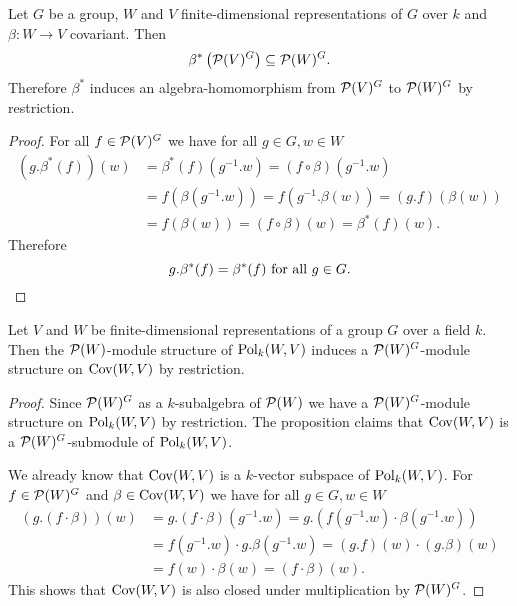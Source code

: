 \begin{prop}
 Let $G$ be a group, $W$ and $V$ finite-dimensional representations of $G$ over $k$ and $\beta \colon W \to V$ covariant. Then
 \[
  \beta^*\left(\mathcal{P}(V)^G\right) \subseteq \mathcal{P}(W)^G.
 \]
 Therefore $\beta^*$ induces an algebra-homomorphism from $\mathcal{P}(V)^G$ to $\mathcal{P}(W)^G$ by restriction.
\end{prop}
\begin{proof}
 For all $f \in \mathcal{P}(V)^G$ we have for all $g \in G, w \in W$
 \begin{align*}
  (g.\beta^*(f))(w)
  &= \beta^*(f)\left(g^{-1}.w\right)
  = (f \circ \beta)\left(g^{-1}.w\right) \\
  &= f\left(\beta\left(g^{-1}.w\right)\right)
  = f\left(g^{-1}.\beta(w)\right)
  = (g.f)(\beta(w)) \\
  &= f(\beta(w))
  = (f \circ \beta)(w)
  = \beta^*(f)(w).
 \end{align*}
 Therefore
 \[
  g.\beta^*(f) = \beta^*(f) \text{ for all } g \in G.
  \qedhere
 \]
\end{proof}


\begin{prop}
 Let $V$ and $W$ be finite-dimensional representations of a group $G$ over a field $k$. Then the $\mathcal{P}(W)$-module structure of $\operatorname{Pol}_k(W,V)$ induces a $\mathcal{P}(W)^G$-module structure on $\operatorname{Cov}(W,V)$ by restriction.
\end{prop}
\begin{proof}
 Since $\mathcal{P}(W)^G$ as a $k$-subalgebra of $\mathcal{P}(W)$ we have a $\mathcal{P}(W)^G$-module structure on $\operatorname{Pol}_k(W,V)$ by restriction. The proposition claims that $\operatorname{Cov}(W,V)$ is a $\mathcal{P}(W)^G$-submodule of $\operatorname{Pol}_k(W,V)$.
 
 We already know that $\operatorname{Cov}(W,V)$ is a $k$-vector subspace of $\operatorname{Pol}_k(W,V)$. For $f \in \mathcal{P}(W)^G$ and $\beta \in \operatorname{Cov}(W,V)$ we have for all $g \in G, w \in W$
 \begin{align*}
  (g.(f \cdot \beta))(w)
  &= g.(f \cdot \beta)\left(g^{-1}.w\right)
  = g.\left(f\left(g^{-1}.w\right) \cdot \beta\left(g^{-1}.w\right) \right) \\
  &= f\left(g^{-1}.w\right) \cdot g.\beta\left(g^{-1}.w\right)
  = (g.f)(w) \cdot (g.\beta)(w) \\
  &= f(w) \cdot \beta(w)
  = (f \cdot \beta)(w).
 \end{align*}
 This shows that $\operatorname{Cov}(W,V)$ is also closed under multiplication by $\mathcal{P}(W)^G$.
\end{proof}




